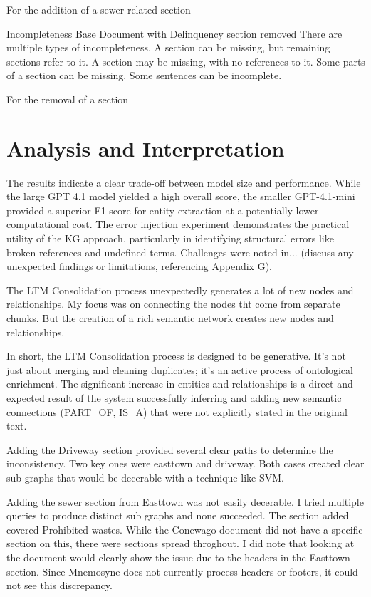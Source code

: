 For the addition of a sewer related section

Incompleteness
Base Document with Delinquency section removed
There are multiple types of incompleteness. A section can be missing, but remaining sections refer to it. A section may be missing, with no references to it. Some parts of a section can be missing. Some sentences can be incomplete.


For the removal of a section


\section{Analysis and Interpretation}
\label{sec:analysis}
The results indicate a clear trade-off between model size and performance. While the large GPT 4.1 model yielded a high overall score, the smaller GPT-4.1-mini provided a superior F1-score for entity extraction at a potentially lower computational cost. The error injection experiment demonstrates the practical utility of the KG approach, particularly in identifying structural errors like broken references and undefined terms. Challenges were noted in... (discuss any unexpected findings or limitations, referencing Appendix G).

The LTM Consolidation process unexpectedly generates a lot of new nodes and relationships. My focus was on connecting the nodes tht come from separate chunks. But the creation of a rich semantic network creates new nodes and relationships.

In short, the LTM Consolidation process is designed to be generative. It's not just about merging and cleaning duplicates; it's an active process of ontological enrichment. The significant increase in entities and relationships is a direct and expected result of the system successfully inferring and adding new semantic connections (PART\_OF, IS\_A) that were not explicitly stated in the original text.

Adding the Driveway section provided several clear paths to determine the inconsistency. Two key ones were easttown and driveway. Both cases created clear sub graphs that would be decerable with a technique like SVM.

Adding the sewer section from Easttown was not easily decerable. I tried multiple queries to produce distinct sub graphs and none succeeded. The section added covered Prohibited wastes. While the Conewago document did not have a specific section on this, there were sections spread throghout. I did note that looking at the document would clearly show the issue due to the headers in the Easttown section. Since Mnemosyne does not currently process headers or footers, it could not see this discrepancy.

